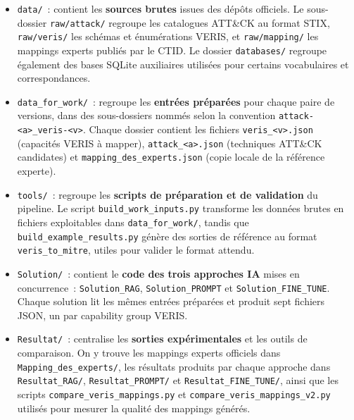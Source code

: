 \documentclass[a4paper,12pt]{article}
\begin{document}
\begin{itemize}
    \item \texttt{data/}~: contient les \textbf{sources brutes} issues des dépôts
          officiels. Le sous-dossier \texttt{raw/attack/} regroupe les catalogues
          ATT\&CK au format STIX, \texttt{raw/veris/} les schémas et énumérations VERIS,
          et \texttt{raw/mapping/} les mappings experts publiés par le CTID. Le
          dossier \texttt{databases/} regroupe également des bases SQLite auxiliaires
          utilisées pour certains vocabulaires et correspondances.

    \item \texttt{data\_for\_work/}~: regroupe les \textbf{entrées préparées} pour
          chaque paire de versions, dans des sous-dossiers nommés selon la convention
          \texttt{attack-<a>\_veris-<v>}. Chaque dossier contient les fichiers
          \texttt{veris\_<v>.json} (capacités VERIS à mapper),
          \texttt{attack\_<a>.json} (techniques ATT\&CK candidates) et
          \texttt{mapping\_des\_experts.json} (copie locale de la référence experte).

    \item \texttt{tools/}~: regroupe les \textbf{scripts de préparation et de
          validation} du pipeline. Le script \texttt{build\_work\_inputs.py} transforme
          les données brutes en fichiers exploitables dans
          \texttt{data\_for\_work/}, tandis que \texttt{build\_example\_results.py}
          génère des sorties de référence au format \texttt{veris\_to\_mitre}, utiles
          pour valider le format attendu.

    \item \texttt{Solution/}~: contient le \textbf{code des trois approches IA}
          mises en concurrence~: \texttt{Solution\_RAG}, \texttt{Solution\_PROMPT} et
          \texttt{Solution\_FINE\_TUNE}. Chaque solution lit les mêmes entrées
          préparées et produit sept fichiers JSON, un par capability group VERIS.

    \item \texttt{Resultat/}~: centralise les \textbf{sorties expérimentales} et les
          outils de comparaison. On y trouve les mappings experts officiels dans
          \texttt{Mapping\_des\_experts/}, les résultats produits par chaque approche
          dans \texttt{Resultat\_RAG/}, \texttt{Resultat\_PROMPT/} et
          \texttt{Resultat\_FINE\_TUNE/}, ainsi que les scripts
          \texttt{compare\_veris\_mappings.py} et
          \texttt{compare\_veris\_mappings\_v2.py} utilisés pour mesurer la qualité
          des mappings générés.
\end{itemize}
\end{document}
